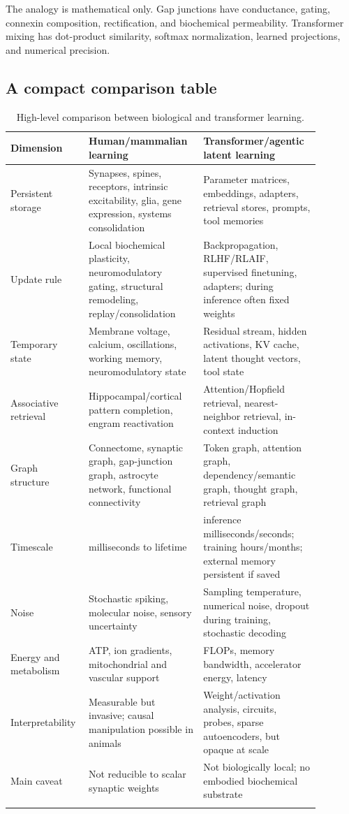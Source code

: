 \documentclass[11pt]{article}
\newcommand{\1}{\mathbf{1}}
\begin{document}
The analogy is mathematical only. Gap junctions have conductance, gating, connexin composition, rectification, and biochemical permeability. Transformer mixing has dot-product similarity, softmax normalization, learned projections, and numerical precision.

\subsection{A compact comparison table}

\begin{longtable}{p{0.18\linewidth}p{0.35\linewidth}p{0.35\linewidth}}
\toprule
Dimension & Human/mammalian learning & Transformer/agentic latent learning \\
\midrule
Persistent storage & Synapses, spines, receptors, intrinsic excitability, glia, gene expression, systems consolidation & Parameter matrices, embeddings, adapters, retrieval stores, prompts, tool memories \\
Update rule & Local biochemical plasticity, neuromodulatory gating, structural remodeling, replay/consolidation & Backpropagation, RLHF/RLAIF, supervised finetuning, adapters; during inference often fixed weights \\
Temporary state & Membrane voltage, calcium, oscillations, working memory, neuromodulatory state & Residual stream, hidden activations, KV cache, latent thought vectors, tool state \\
Associative retrieval & Hippocampal/cortical pattern completion, engram reactivation & Attention/Hopfield retrieval, nearest-neighbor retrieval, in-context induction \\
Graph structure & Connectome, synaptic graph, gap-junction graph, astrocyte network, functional connectivity & Token graph, attention graph, dependency/semantic graph, thought graph, retrieval graph \\
Timescale & milliseconds to lifetime & inference milliseconds/seconds; training hours/months; external memory persistent if saved \\
Noise & Stochastic spiking, molecular noise, sensory uncertainty & Sampling temperature, numerical noise, dropout during training, stochastic decoding \\
Energy and metabolism & ATP, ion gradients, mitochondrial and vascular support & FLOPs, memory bandwidth, accelerator energy, latency \\
Interpretability & Measurable but invasive; causal manipulation possible in animals & Weight/activation analysis, circuits, probes, sparse autoencoders, but opaque at scale \\
Main caveat & Not reducible to scalar synaptic weights & Not biologically local; no embodied biochemical substrate \\
\bottomrule
\caption{High-level comparison between biological and transformer learning.}
\end{longtable}
\end{document}
